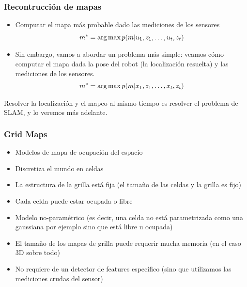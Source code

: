 \begin{frame}
    \frametitle{Recontrucción de mapas}
    
    \begin{itemize}
        \item Computar el mapa más probable dado las mediciones de los sensores
        \begin{equation*}
            m^{*} = \operatorname*{arg\,max} p(m | u_{1}, z_{1}, \dots, u_{t}, z_{t})
        \end{equation*}
        \item Sin embargo, vamos a abordar un problema más simple: veamos cómo computar el mapa dada la pose del robot (la localización resuelta) y las mediciones de los sensores.
        \begin{equation*}
            m^{*} = \operatorname*{arg\,max} p(m | x_{1}, z_{1}, \dots, x_{t}, z_{t})
        \end{equation*}
    \end{itemize}

    \alert{Resolver la localización y el mapeo al mismo tiempo es resolver el problema de SLAM, y lo veremos más adelante.}
    
\end{frame}

\begin{frame}
    \frametitle{Grid Maps}
    
    \note{}
    
    \begin{itemize}
        \item Modelos de mapa de ocupación del espacio
        \item Discretiza el mundo en celdas
        \item La estructura de la grilla está fija (el tamaño de las celdas y la grilla es fijo)
        \item Cada celda puede estar ocupada o libre
        \item Modelo no-paramétrico (es decir, una celda no está parametrizada como una gaussiana por ejemplo sino que está libre u ocupada)
        \item El tamaño de los mapas de grilla puede requerir mucha memoria (en el caso 3D sobre todo)
        \item No requiere de un detector de features específico (sino que utilizamos las mediciones crudas del sensor)
    \end{itemize}
\end{frame}

